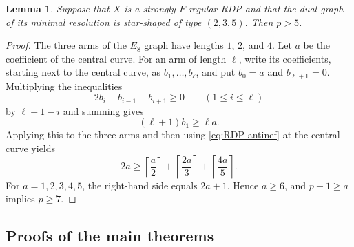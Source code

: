 \documentclass[12pt]{amsart}
\def\ge{\geqslant}
\def\le{\leqslant}
\theoremstyle{plain}
\newtheorem{lem}[thm]{Lemma}
\theoremstyle{definition}
\theoremstyle{remark}
\newtheorem{defn and notation}[thm]{Definition and Notation}
\theoremstyle{plain}
\numberwithin{equation}{thm}
\begin{document}
\begin{lem}\label{lem:RDP3}
Suppose that $X$ is a strongly $F$-regular RDP and that the dual graph of its minimal resolution is star-shaped of type $(2,3,5)$.
Then $p>5$.
\end{lem}
\begin{proof}
The three arms of the $E_8$ graph have lengths $1$, $2$, and $4$.
Let $a$ be the coefficient of the central curve.
For an arm of length $\ell$, write its coefficients, starting next to the central curve, as $b_1,\ldots,b_\ell$, and put $b_0=a$ and $b_{\ell+1}=0$.
Multiplying the inequalities
\[
2b_i-b_{i-1}-b_{i+1}\ge0\qquad(1\le i\le\ell)
\]
by $\ell+1-i$ and summing gives
\[
(\ell+1)b_1\ge\ell a.
\]
Applying this to the three arms and then using \eqref{eq:RDP-antinef} at the central curve yields
\[
2a\ge
\left\lceil\frac a2\right\rceil+
\left\lceil\frac{2a}{3}\right\rceil+
\left\lceil\frac{4a}{5}\right\rceil.
\]
For $a=1,2,3,4,5$, the right-hand side equals $2a+1$.
Hence $a\ge6$, and $p-1\ge a$ implies $p\ge7$.
\end{proof}

\subsection{Proofs of the main theorems}
\end{document}
